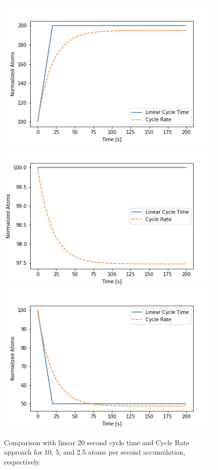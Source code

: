 \begin{figure}[H]
  \centering
  \includegraphics[scale=0.6]{images/Cycle_Rate_example_10.png}
  \includegraphics[scale=0.6]{images/Cycle_Rate_example_5.png}
  \includegraphics[scale=0.6]{images/Cycle_Rate_example_2_5.png}
  \caption{Comparison with linear 20 second cycle time and Cycle Rate approach for 10, 5, and 2.5 atoms per second accumulation, respectively.}
   \label{fig:cr_examples}
\end{figure}



